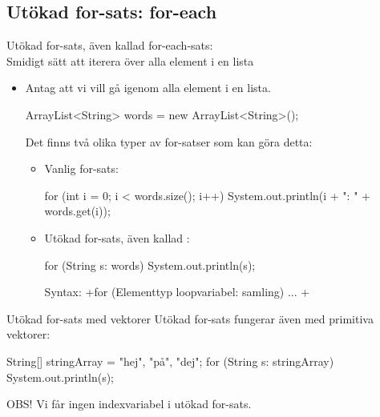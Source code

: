 \documentclass{lecturenotes}
\begin{document}
\subsection{Utökad for-sats: for-each}
\begin{Slide}{Utökad for-sats, även kallad for-each-sats: \\ Smidigt sätt att iterera över alla element i en lista}\footnotesize
\begin{itemize}
\item  Antag att vi vill gå igenom alla element i en lista. 
\begin{Code}[numberstyle=]
        ArrayList<String> words = new ArrayList<String>();
\end{Code}
Det finns två olika typer av for-satser som kan göra detta:
\begin{itemize}\footnotesize
\item  Vanlig for-sats:
\begin{Code}[numberstyle=]
for (int i = 0; i < words.size(); i++) {
    System.out.println(i + ": " + words.get(i));
}
\end{Code}

\item  Utökad for-sats, även kallad :
\begin{Code}[numberstyle=]
for (String s: words) {
    System.out.println(s);
}
\end{Code}
Syntax: \code+for (Elementtyp loopvariabel: samling) { ... }+
\end{itemize}
\end{itemize}
\end{Slide}

\begin{Slide}{Utökad for-sats med vektorer}
Utökad for-sats fungerar även med primitiva vektorer:
\begin{Code}[numberstyle=]
        String[] stringArray = {"hej", "på", "dej"};
        for (String s: stringArray){
            System.out.println(s);
        }
\end{Code}
OBS! Vi får ingen indexvariabel i utökad for-sats.
\end{Slide}
\end{document}
